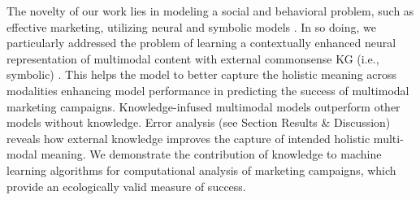 The novelty of our work lies in modeling a social and behavioral problem, such as effective marketing, utilizing neural and symbolic models \cite{sap2022neural}. In so doing, we particularly addressed the problem of learning a contextually enhanced neural representation of multimodal content with external commonsense KG (i.e., symbolic) \cite{yu2022probabilistic,kursuncu2020kil}. This helps the model to better capture the holistic meaning across modalities enhancing model performance in predicting the success of multimodal marketing campaigns.
Knowledge-infused multimodal models outperform other models without knowledge. Error analysis (see Section Results \& Discussion) reveals how external knowledge improves the capture of intended holistic multi-modal meaning. 
We demonstrate the contribution of knowledge to machine learning algorithms 
for computational analysis of marketing campaigns, which provide an ecologically valid measure of success.

